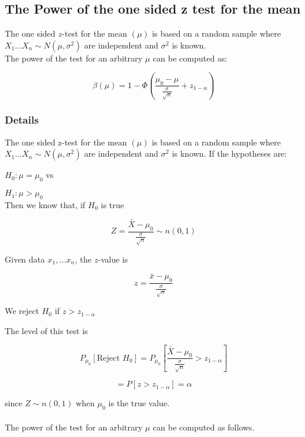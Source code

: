 \documentclass[12pt,a4paper]{article}
\theoremstyle{regla}
\theoremstyle{remark}
\theoremstyle{definition}
\theoremstyle{nonumberbreak}
\begin{document}
\subsection{The Power of the one sided z test for the mean}
\begin{fbox}
\begin{minipage}{0.97\textwidth}
The one sided $z$-test for the mean $(\mu)$ is based on a random sample where $X_1 \ldots X_n \sim N(\mu, \sigma^2)$ are independent and $\sigma^2$ is known.\\

The power of the test for an arbitrary $\mu $ can be computed as:

$$
\beta(\mu) = 1 - \Phi \left ( \frac{\mu_0 - \mu }{\frac{\sigma} {\sqrt{n}}} + z_{1- \alpha} \right )
$$

\end{minipage}
\end{fbox}
\subsubsection{Details}
The one sided z-test for the mean $(\mu)$ is based on a random sample where $X_1 \ldots X_n \sim N(\mu, \sigma^2)$ are independent and $\sigma^2$ is known. If the hypotheses are:

$ H_0 : \mu = \mu_0$ vs

$ H_1 : \mu > \mu_0$\\

Then we know that, if $H_0$ is true

$$Z = \frac{\bar {X} - \mu_0}{\frac{\sigma} {\sqrt{n}}} \sim n (0,1)$$


Given data $x_1, \ldots x_n$, the $z$-value is

$$z = \frac{\bar {x} - \mu_0}{\frac{\sigma} {\sqrt{n}}}$$

We reject $H_0$ if $z > z_{1-\alpha}$

The level of this test is 

$$
P_{\mu_0} [\text{Reject } H_0]= P_{\mu_0}[\frac{\bar {X} - \mu_0}{\frac{\sigma} {\sqrt{n}}} > z_{1- \alpha}]
$$

 $$= P[z > z_{1- \alpha}] = {\alpha} $$

since $ Z \sim n (0,1)$ when $\mu_0$ is the true value.\\\\
 

The power of the test for an arbitrary $\mu $ can be computed as follows.
 
\end{document}
